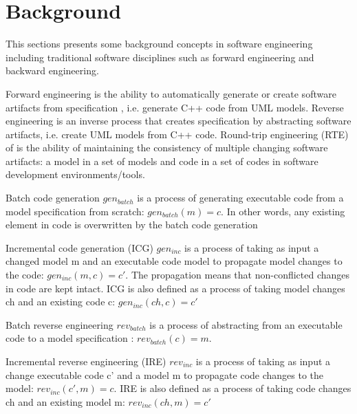 \section{Background}
This sections presents some background concepts in software engineering including traditional software disciplines such as forward engineering and backward engineering.

Forward engineering is the ability to automatically generate or create software artifacts from specification \cite{Sendall}, i.e. generate C++ code from UML \cite{Specification2007} models. Reverse engineering is an inverse process that creates specification by abstracting software artifacts, i.e. create UML models from C++ code. Round-trip engineering (RTE) of is the ability of maintaining the consistency of multiple changing software artifacts: a model  in a set of models  and code  in a set of codes  in software development environments/tools. 

\begin{definition}
Batch code generation $gen_{batch}$ is a process of generating executable code  from a model specification  from scratch: $gen_{batch}(m) = c$. In other words, any existing element in code is overwritten by the batch code generation
\end{definition}

\begin{definition}

Incremental code generation (ICG) $gen_{inc}$ is a process of taking as input a changed model m and an executable code model to propagate model changes to the code: $gen_{inc}(m, c) = c'$. The propagation means that non-conflicted changes in code are kept intact. ICG is also defined as a process of taking model changes ch and an existing code c: $gen_{inc}(ch, c) = c'$
\end{definition}

\begin{definition}
Batch reverse engineering $rev_{batch}$ is a process of abstracting from an executable code  to a model specification : $rev_{batch}(c) = m$. 
\end{definition}


\begin{definition}

Incremental reverse engineering (IRE) $rev_{inc}$ is a process of taking as input a change executable code c' and a model m to propagate code changes to the model: $rev_{inc}(c', m) = c$. IRE is also defined as a process of taking code changes ch and an existing model m: $rev_{inc}(ch, m) = c'$
\end{definition}

